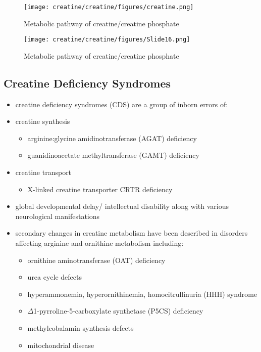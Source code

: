 \documentclass{scrartcl}
\begin{document}
\begin{figure}[htbp]
\centering
\texttt{[image: creatine/creatine/figures/creatine.png]}
\caption{\label{fig:orgacedf4f}Metabolic pathway of creatine/creatine phosphate}
\end{figure}

\begin{figure}[htbp]
\centering
\texttt{[image: creatine/creatine/figures/Slide16.png]}
\caption{\label{fig:org36465e8}Metabolic pathway of creatine/creatine phosphate}
\end{figure}

\subsection{Creatine Deficiency Syndromes}
\label{sec:org4dc2dec}
\begin{itemize}
\item creatine deficiency syndromes (CDS) are a group of inborn errors of:
\item creatine synthesis
\begin{itemize}
\item arginine:glycine amidinotransferase (AGAT) deficiency
\item guanidinoacetate methyltransferase (GAMT) deficiency
\end{itemize}
\item creatine transport
\begin{itemize}
\item X-linked creatine transporter CRTR deficiency
\end{itemize}
\item global developmental delay/ intellectual disability along with
various neurological manifestations

\item secondary changes in creatine metabolism have been described in
disorders affecting arginine and ornithine metabolism including:
\begin{itemize}
\item ornithine aminotransferase (OAT) deficiency
\item urea cycle defects
\item hyperammonemia, hyperornithinemia, homocitrullinuria (HHH) syndrome
\item \(\Delta\)1-pyrroline-5-carboxylate synthetase (P5CS) deficiency
\item methylcobalamin synthesis defects
\item mitochondrial disease
\end{itemize}
\end{itemize}
\end{document}
